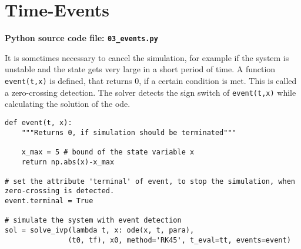 \documentclass[a4paper,11pt,headinclude=true,headsepline,parskip=half,DIV=12]{scrartcl}
\newcommand{\py}{Python\xspace}
\newcommand{\code}[1]{\lstinline[basicstyle=\normalsize\ttfamily]{#1}}
\begin{document}
\section{Time-Events}
\textbf{\py source code file: \texttt{03\_events.py}}

It is sometimes necessary to cancel the simulation, for example if the system is unstable and the state gets very large in a short period of time. A function \code{event(t,x)} is defined, that returns 0, if a certain condition is met. This is called a zero-crossing detection. The solver detects the sign switch of \code{event(t,x)} while calculating the solution of the \gls{ode}.
\begin{lstlisting}
def event(t, x):
	"""Returns 0, if simulation should be terminated"""
	
	x_max = 5 # bound of the state variable x
	return np.abs(x)-x_max
		
# set the attribute 'terminal' of event, to stop the simulation, when zero-crossing is detected.
event.terminal = True

# simulate the system with event detection
sol = solve_ivp(lambda t, x: ode(x, t, para), 
               (t0, tf), x0, method='RK45', t_eval=tt, events=event)
\end{lstlisting}
\printglossaries
\printbibliography
\end{document}
